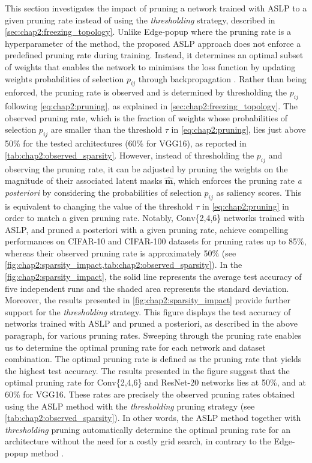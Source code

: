 This section investigates the impact of pruning a network trained with \ac{ASLP}
to a given pruning rate instead of using the \emph{thresholding} strategy,
described in \cref{sec:chap2:freezing_topology}. Unlike Edge-popup
\cite{DBLP:conf/cvpr/RamanujanWKFR20} where the pruning rate is a hyperparameter
of the method, the proposed \ac{ASLP} approach does not enforce a predefined
pruning rate during training. Instead, it determines an optimal subset of
weights that enables the network to minimises the loss function by updating
weights probabilities of selection $p_{ij}$ through backpropagation
\cite{rumelhart1986learning}. Rather than being enforced, the pruning rate is
observed and is determined by thresholding the $p_{ij}$ following
\cref{eq:chap2:pruning}, as explained in \cref{sec:chap2:freezing_topology}. The
observed pruning rate, which is the fraction of weights whose probabilities of
selection $p_{ij}$ are smaller than the threshold $\tau$ in
\cref{eq:chap2:pruning}, lies just above 50\% for the tested architectures (60\%
for VGG16), as reported in \cref{tab:chap2:observed_sparsity}. However, instead
of thresholding the $p_{ij}$ and observing the pruning rate, it can be adjusted
by pruning the weights on the magnitude of their associated latent masks
$\bm{\hat{m}}$, which enforces the pruning rate \emph{a posteriori} by
considering the probabilities of selection $p_{ij}$ as saliency scores. This is
equivalent to changing the value of the threshold $\tau$ in
\cref{eq:chap2:pruning} in order to match a given pruning rate. Notably,
Conv\{2,4,6\} networks trained with \ac{ASLP}, and pruned a posteriori with a
given pruning rate, achieve compelling performances on CIFAR-10 and CIFAR-100
datasets for pruning rates up to 85\%, whereas their observed pruning rate is
approximately 50\% (see
\cref{fig:chap2:sparsity_impact,tab:chap2:observed_sparsity}). In the
\cref{fig:chap2:sparsity_impact}, the solid line represents the average test
accuracy of five independent runs and the shaded area represents the standard
deviation.\\

Moreover, the results presented in \cref{fig:chap2:sparsity_impact} provide
further support for the \textit{thresholding} strategy. This figure displays the
test accuracy of networks trained with \ac{ASLP} and pruned a posteriori, as
described in the above paragraph, for various pruning rates. Sweeping through
the pruning rate enables us to determine the optimal pruning rate for each
network and dataset combination. The optimal pruning rate is defined as the
pruning rate that yields the highest test accuracy. The results presented in the
figure suggest that the optimal pruning rate for Conv\{2,4,6\} and ResNet-20
networks lies at 50\%, and at 60\% for VGG16. These rates are precisely the
observed pruning rates obtained using the \ac{ASLP} method with the
\emph{thresholding} pruning strategy (see \cref{tab:chap2:observed_sparsity}).
In other words, the \ac{ASLP} method together with \emph{thresholding} pruning
automatically determine the optimal pruning rate for an architecture without the
need for a costly grid search, in contrary to the Edge-popup method
\cite{DBLP:conf/cvpr/RamanujanWKFR20}.\\

